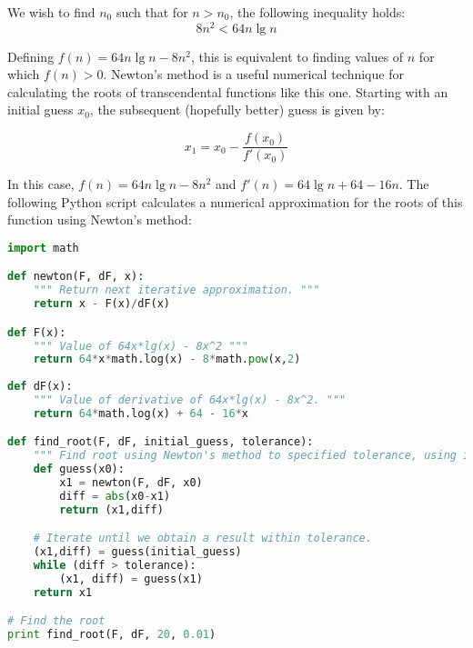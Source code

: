 \documentclass[a4paper,12pt]{article}
\begin{document}

We wish to find $n_0$ such that for $n > n_0$, the following inequality holds:
\[ 8n^2 < 64n \lg n\]

Defining $f(n) = 64n \lg n - 8n^2$, this is equivalent to finding values of $n$ for which 
$f(n) > 0$. Newton's method is a useful numerical technique for calculating the roots 
of transcendental functions like this one. Starting with an initial guess $x_0$, the 
subsequent (hopefully better) guess is given by:

\[ x_1 = x_0 - \frac{f(x_0)}{f'(x_0)} \]

In this case, $f(n) = 64n \lg n - 8n^2$ and $f'(n) = 64\lg n + 64- 16n$. The following Python script calculates a numerical 
approximation for the roots of this function using Newton's method:

\begin{lstlisting}[language=Python]
import math

def newton(F, dF, x):
    """ Return next iterative approximation. """
    return x - F(x)/dF(x)

def F(x):
    """ Value of 64x*lg(x) - 8x^2 """
    return 64*x*math.log(x) - 8*math.pow(x,2)
    
def dF(x):
    """ Value of derivative of 64x*lg(x) - 8x^2. """
    return 64*math.log(x) + 64 - 16*x

def find_root(F, dF, initial_guess, tolerance):
    """ Find root using Newton's method to specified tolerance, using initial guess. """
    def guess(x0):
        x1 = newton(F, dF, x0)
        diff = abs(x0-x1)
        return (x1,diff)

    # Iterate until we obtain a result within tolerance.                                                   
    (x1,diff) = guess(initial_guess)
    while (diff > tolerance):
        (x1, diff) = guess(x1)
    return x1

# Find the root                                                                                            
print find_root(F, dF, 20, 0.01)
\end{lstlisting}
\end{document}
